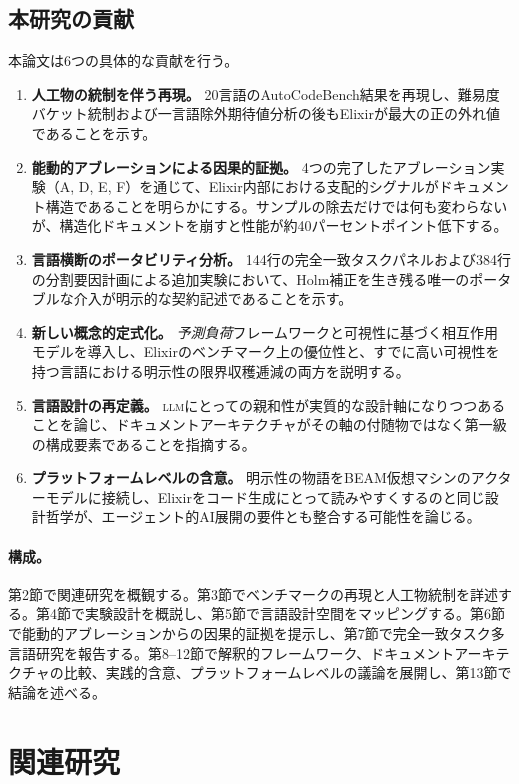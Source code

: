 \documentclass[11pt]{article}
\newcommand{\acb}{AutoCodeBench}
\newcommand{\elixir}{Elixir}
\newcommand{\acro}[1]{\textsc{\MakeLowercase{#1}}}
\begin{document}
\subsection*{本研究の貢献}

本論文は6つの具体的な貢献を行う。

\begin{enumerate}
  \item \textbf{人工物の統制を伴う再現。} 20言語の\acb{}結果を再現し、難易度バケット統制および一言語除外期待値分析の後も\elixir{}が最大の正の外れ値であることを示す。
  \item \textbf{能動的アブレーションによる因果的証拠。} 4つの完了したアブレーション実験（A, D, E, F）を通じて、\elixir{}内部における支配的シグナルがドキュメント構造であることを明らかにする。サンプルの除去だけでは何も変わらないが、構造化ドキュメントを崩すと性能が約40パーセントポイント低下する。
  \item \textbf{言語横断のポータビリティ分析。} 144行の完全一致タスクパネルおよび384行の分割要因計画による追加実験において、Holm補正を生き残る唯一のポータブルな介入が明示的な契約記述であることを示す。
  \item \textbf{新しい概念的定式化。} \emph{予測負荷}フレームワークと可視性に基づく相互作用モデルを導入し、\elixir{}のベンチマーク上の優位性と、すでに高い可視性を持つ言語における明示性の限界収穫逓減の両方を説明する。
  \item \textbf{言語設計の再定義。} \acro{LLM}にとっての親和性が実質的な設計軸になりつつあることを論じ、ドキュメントアーキテクチャがその軸の付随物ではなく第一級の構成要素であることを指摘する。
  \item \textbf{プラットフォームレベルの含意。} 明示性の物語をBEAM仮想マシンのアクターモデルに接続し、\elixir{}をコード生成にとって読みやすくするのと同じ設計哲学が、エージェント的AI展開の要件とも整合する可能性を論じる。
\end{enumerate}

\paragraph{構成。}
第2節で関連研究を概観する。第3節でベンチマークの再現と人工物統制を詳述する。第4節で実験設計を概説し、第5節で言語設計空間をマッピングする。第6節で能動的アブレーションからの因果的証拠を提示し、第7節で完全一致タスク多言語研究を報告する。第8--12節で解釈的フレームワーク、ドキュメントアーキテクチャの比較、実践的含意、プラットフォームレベルの議論を展開し、第13節で結論を述べる。

\section{関連研究}
\end{document}
